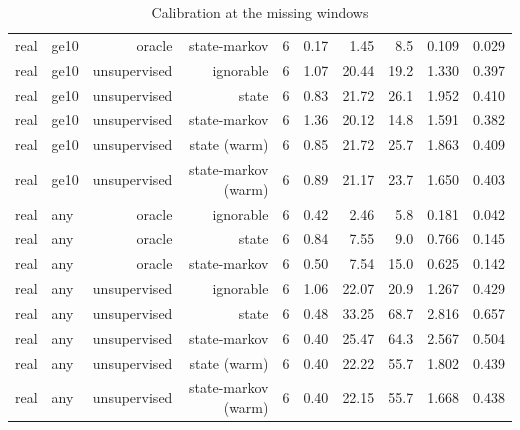 \begin{table}[ht]
\begin{tabular}{llrrrrrrrr}
real & ge10 & oracle & state-markov & 6 & 0.17 & 1.45 & 8.5 & 0.109 & 0.029 \\
real & ge10 & unsupervised & ignorable & 6 & 1.07 & 20.44 & 19.2 & 1.330 & 0.397 \\
real & ge10 & unsupervised & state & 6 & 0.83 & 21.72 & 26.1 & 1.952 & 0.410 \\
real & ge10 & unsupervised & state-markov & 6 & 1.36 & 20.12 & 14.8 & 1.591 & 0.382 \\
real & ge10 & unsupervised & state (warm) & 6 & 0.85 & 21.72 & 25.7 & 1.863 & 0.409 \\
real & ge10 & unsupervised & state-markov (warm) & 6 & 0.89 & 21.17 & 23.7 & 1.650 & 0.403 \\
real & any & oracle & ignorable & 6 & 0.42 & 2.46 & 5.8 & 0.181 & 0.042 \\
real & any & oracle & state & 6 & 0.84 & 7.55 & 9.0 & 0.766 & 0.145 \\
real & any & oracle & state-markov & 6 & 0.50 & 7.54 & 15.0 & 0.625 & 0.142 \\
real & any & unsupervised & ignorable & 6 & 1.06 & 22.07 & 20.9 & 1.267 & 0.429 \\
real & any & unsupervised & state & 6 & 0.48 & 33.25 & 68.7 & 2.816 & 0.657 \\
real & any & unsupervised & state-markov & 6 & 0.40 & 25.47 & 64.3 & 2.567 & 0.504 \\
real & any & unsupervised & state (warm) & 6 & 0.40 & 22.22 & 55.7 & 1.802 & 0.439 \\
real & any & unsupervised & state-markov (warm) & 6 & 0.40 & 22.15 & 55.7 & 1.668 & 0.438 \\
\bottomrule
\end{tabular}
\caption{Calibration at the missing windows}
\end{table}
